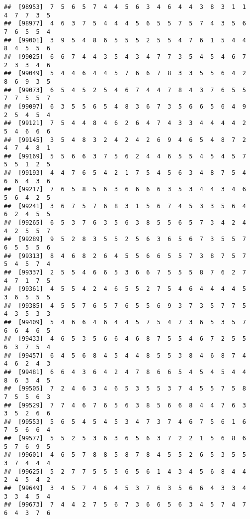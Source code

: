 \documentclass[
]{book}
\begin{document}
\begin{verbatim}
##  [98953]  7  5  6  5  7  4  4  5  6  3  4  6  4  4  3  8  3  1  1  4  7  7  3  5
##  [98977]  4  6  3  7  5  4  4  4  5  6  5  5  7  5  7  4  3  5  6  7  6  5  5  4
##  [99001]  3  9  5  4  8  6  5  5  5  2  5  5  4  7  6  1  5  4  4  8  4  5  5  6
##  [99025]  6  6  7  4  4  3  5  4  3  4  7  7  3  5  4  5  4  6  7  2  3  3  4  6
##  [99049]  5  4  4  6  4  4  5  7  6  6  7  8  3  3  5  5  6  4  2  8  6  9  3  5
##  [99073]  6  5  4  5  2  5  4  6  7  4  4  7  8  4  3  7  6  5  5  7  7  5  5  7
##  [99097]  6  3  5  5  6  5  4  8  3  6  7  3  5  6  6  5  6  4  9  2  5  4  5  4
##  [99121]  7  5  4  4  8  4  6  2  6  4  7  4  3  3  4  4  4  4  2  5  4  6  6  6
##  [99145]  3  5  4  8  3  2  4  2  4  2  6  9  4  6  5  4  8  7  2  4  7  4  8  1
##  [99169]  5  5  6  6  3  7  5  6  2  4  4  6  5  5  4  5  4  5  7  5  5  1  2  5
##  [99193]  4  4  7  6  5  4  2  1  7  5  4  5  6  3  4  8  7  5  4  6  6  4  3  6
##  [99217]  7  6  5  8  5  6  3  6  6  6  6  3  5  3  4  4  3  4  6  5  6  4  2  5
##  [99241]  3  6  7  5  7  6  8  3  1  5  6  7  4  5  3  3  5  6  4  6  2  4  5  5
##  [99265]  6  5  3  7  6  3  5  6  3  8  5  5  6  5  7  3  4  2  4  4  2  5  5  7
##  [99289]  9  5  2  8  3  5  5  2  5  6  3  6  5  6  7  3  5  5  7  6  5  5  5  6
##  [99313]  8  4  6  8  2  6  4  5  5  6  6  5  5  7  3  8  7  5  7  5  4  5  7  4
##  [99337]  2  5  5  4  6  6  5  3  6  6  7  5  5  5  8  7  6  2  7  4  7  1  7  5
##  [99361]  4  5  5  4  2  4  6  5  5  2  7  5  4  6  4  4  4  4  5  3  6  5  5  5
##  [99385]  4  5  5  7  6  5  7  6  5  5  6  9  3  7  3  5  7  7  5  4  3  5  3  3
##  [99409]  5  4  6  6  4  6  4  4  5  7  5  4  7  3  6  5  3  5  7  6  6  4  6  5
##  [99433]  4  6  5  3  5  6  6  4  6  8  7  5  5  4  6  7  2  5  5  6  3  7  5  4
##  [99457]  6  4  5  6  8  4  5  4  4  8  5  5  3  8  4  6  8  7  4  4  6  2  4  3
##  [99481]  6  6  4  3  6  4  2  4  7  8  6  6  5  4  5  4  5  4  4  8  6  3  4  5
##  [99505]  7  2  4  6  3  4  6  5  3  5  5  3  7  4  5  5  7  5  8  7  5  5  6  3
##  [99529]  7  7  4  6  7  6  5  6  3  8  5  6  6  8  4  4  7  6  3  3  5  2  6  6
##  [99553]  5  6  5  4  5  4  5  3  4  7  3  7  4  6  7  5  6  1  6  7  5  6  6  4
##  [99577]  5  5  2  5  3  6  3  6  5  6  3  7  2  2  1  5  6  8  6  5  7  6  9  5
##  [99601]  4  6  5  7  8  8  5  8  7  8  4  5  5  2  6  5  3  5  5  3  7  4  4  4
##  [99625]  5  2  7  7  5  5  5  6  5  6  1  4  3  4  5  6  8  4  4  2  4  5  4  2
##  [99649]  3  4  5  7  4  6  4  5  3  7  6  3  5  6  6  4  3  3  4  3  3  4  5  4
##  [99673]  7  4  4  2  7  5  6  7  3  6  6  5  6  3  4  5  7  4  7  6  4  3  7  6

\end{verbatim}
\end{document}
